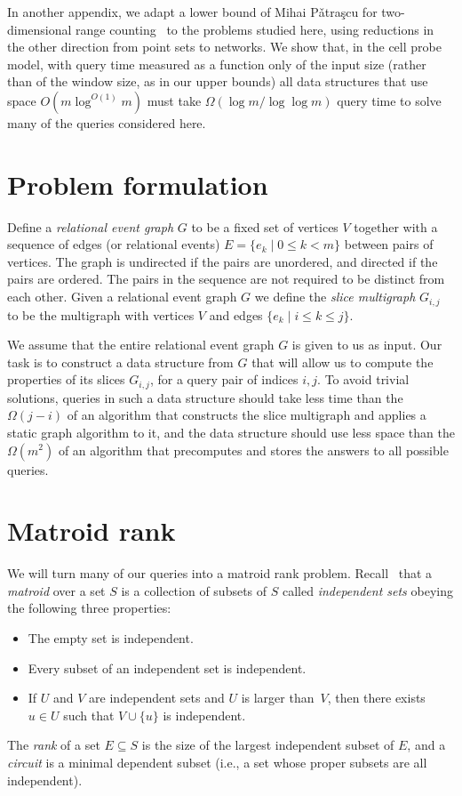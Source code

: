 \documentclass[11pt]{article}
\begin{document}
In another appendix, we adapt a lower bound of Mihai P{\v a}tra{\c s}cu for two-dimensional range counting~\cite{Pat-STOC-07} to the problems studied here, using reductions in the other direction from point sets to networks. We show that, in the cell probe model, with query time measured as a function only of the input size (rather than of the window size, as in our upper bounds) all data structures that use space $O(m\log^{O(1)} m)$ must take $\Omega(\log m/\log\log m)$ query time to solve many of the queries considered here.

\section{Problem formulation}
Define a \emph{relational event graph} $G$ to be a fixed set of vertices $V$ together with a sequence of edges (or relational events) $E = \{e_k \mid 0 \leq k < m\}$ between pairs of vertices. The graph is undirected if the pairs are unordered, and directed if the pairs are ordered. The pairs in the sequence are not required to be distinct from each other.
Given a relational event graph $G$ we define the \emph{slice multigraph} $G_{i,j}$ to be the multigraph with vertices $V$ and edges $\{ e_k\mid i\le k\le j\}$.

We assume that the entire relational event graph $G$ is given to us as input.  Our task is to construct a data structure from $G$ that will allow us to compute the properties of its slices $G_{i,j}$, for a query pair of indices $i,j$. To avoid trivial solutions, queries in such a data structure should take less time than the $\Omega(j-i)$ of an algorithm that constructs the slice multigraph and applies a static graph algorithm to it, and the data structure should use less space than the $\Omega(m^2)$ of an algorithm that precomputes and stores the answers to all possible queries.

\section{Matroid rank}
We will turn many of our queries into a matroid rank problem. Recall~\cite{Lawler01, Welsh10} that a \emph{matroid} over a set $S$ is a collection of subsets of $S$ called \emph{independent sets} 
obeying the following three properties:
\begin{itemize}
\item The empty set is independent.
\item Every subset of an independent set is independent.
\item If $U$ and $V$ are independent sets and $U$ is larger than~$V$, then there exists $u\in U$ such that $V \cup \{u\}$ is independent.
\end{itemize}
The \emph{rank} of a set $E \subseteq S$ is the size of the largest independent subset of $E$, and a \emph{circuit} is a minimal dependent subset (i.e., a set whose proper subsets are all independent).
\end{document}
